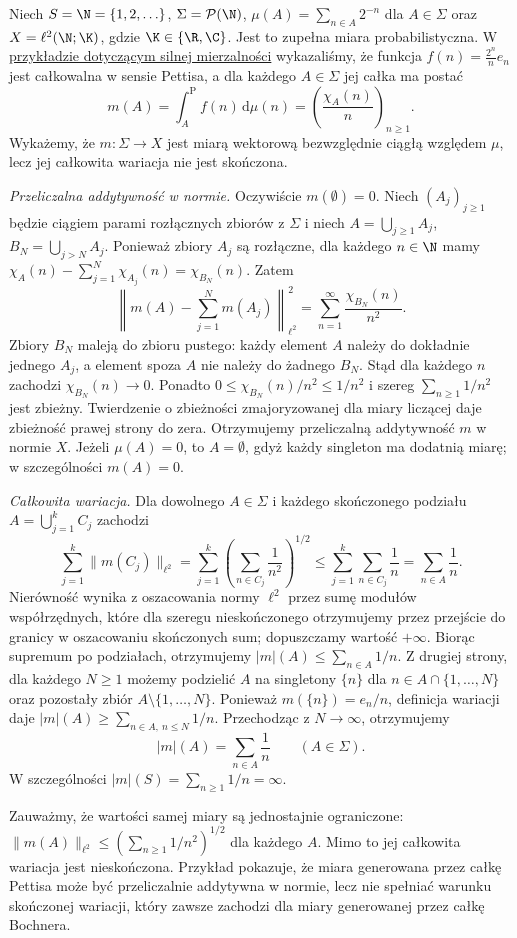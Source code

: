\begin{przyklad}
\label{ex:pettis-infinite-variation15b}
Niech $S=\N=\{1,2,\ldots\}$, $\Sigma=\mathcal P(\N)$,
$\mu(A)=\sum_{n\in A}2^{-n}$ dla $A\in\Sigma$ oraz
$X=\ell^2(\N;\K)$, gdzie $\K\in\{\R,\C\}$.
Jest to zupełna miara probabilistyczna. W
\hyperref[ex:pettis-strong-not-bochner15b]{przykładzie dotyczącym silnej mierzalności}
wykazaliśmy, że funkcja $f(n)=\frac{2^n}{n}e_n$ jest
całkowalna w sensie Pettisa, a dla każdego $A\in\Sigma$
jej całka ma postać
\[
 m(A)=\int_A^{\mathrm P}f(n)\,\mathrm d\mu(n)
 =\left(\frac{\chi_A(n)}{n}\right)_{n\ge1}.
\]
Wykażemy, że $m:\Sigma\to X$ jest miarą wektorową
bezwzględnie ciągłą względem $\mu$, lecz jej całkowita
wariacja nie jest skończona.

\emph{Przeliczalna addytywność w normie.}
Oczywiście $m(\emptyset)=0$. Niech $(A_j)_{j\ge1}$ będzie
ciągiem parami rozłącznych zbiorów z $\Sigma$ i niech
$A=\bigcup_{j\ge1}A_j$, $B_N=\bigcup_{j>N}A_j$.
Ponieważ zbiory $A_j$ są rozłączne, dla każdego $n\in\N$
mamy $\chi_A(n)-\sum_{j=1}^N\chi_{A_j}(n)=\chi_{B_N}(n)$.
Zatem
\[
 \left\|m(A)-\sum_{j=1}^Nm(A_j)\right\|_{\ell^2}^2
 =\sum_{n=1}^{\infty}\frac{\chi_{B_N}(n)}{n^2}.
\]
Zbiory $B_N$ maleją do zbioru pustego: każdy element $A$
należy do dokładnie jednego $A_j$, a element spoza $A$
nie należy do żadnego $B_N$. Stąd dla każdego $n$
zachodzi $\chi_{B_N}(n)\to0$. Ponadto
$0\le\chi_{B_N}(n)/n^2\le1/n^2$ i szereg
$\sum_{n\ge1}1/n^2$ jest zbieżny. Twierdzenie o zbieżności
zmajoryzowanej dla miary liczącej daje zbieżność prawej
strony do zera. Otrzymujemy przeliczalną addytywność
$m$ w normie $X$. Jeżeli $\mu(A)=0$, to $A=\emptyset$,
gdyż każdy singleton ma dodatnią miarę; w szczególności
$m(A)=0$.

\emph{Całkowita wariacja.}
Dla dowolnego $A\in\Sigma$ i każdego skończonego podziału
$A=\bigcup_{j=1}^k C_j$ zachodzi
\[
 \sum_{j=1}^k\|m(C_j)\|_{\ell^2}
 =\sum_{j=1}^k\left(\sum_{n\in C_j}\frac1{n^2}\right)^{1/2}
 \le\sum_{j=1}^k\sum_{n\in C_j}\frac1n
 =\sum_{n\in A}\frac1n.
\]
Nierówność wynika z oszacowania normy $\ell^2$ przez
sumę modułów współrzędnych, które dla szeregu nieskończonego
otrzymujemy przez przejście do granicy w oszacowaniu
skończonych sum; dopuszczamy wartość $+\infty$.
Biorąc supremum po podziałach, otrzymujemy
$|m|(A)\le\sum_{n\in A}1/n$.
Z drugiej strony, dla każdego $N\ge1$ możemy podzielić $A$
na singletony $\{n\}$ dla $n\in A\cap\{1,\ldots,N\}$
oraz pozostały zbiór $A\setminus\{1,\ldots,N\}$.
Ponieważ $m(\{n\})=e_n/n$, definicja wariacji daje
$|m|(A)\ge\sum_{n\in A,\ n\le N}1/n$.
Przechodząc z $N\to\infty$, otrzymujemy
\[
 |m|(A)=\sum_{n\in A}\frac1n
 \qquad(A\in\Sigma).
\]
W szczególności $|m|(S)=\sum_{n\ge1}1/n=\infty$.

Zauważmy, że wartości samej miary są jednostajnie ograniczone:
$\|m(A)\|_{\ell^2}\le(\sum_{n\ge1}1/n^2)^{1/2}$
dla każdego $A$. Mimo to jej całkowita wariacja jest
nieskończona. Przykład pokazuje, że miara generowana przez
całkę Pettisa może być przeliczalnie addytywna w normie,
lecz nie spełniać warunku skończonej wariacji, który
zawsze zachodzi dla miary generowanej przez całkę Bochnera.
\end{przyklad}

